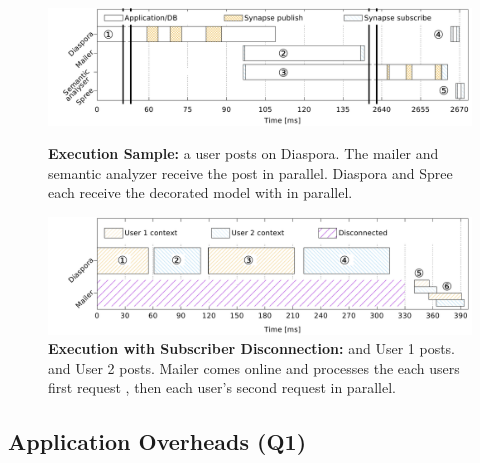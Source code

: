 \begin{figure}
  \centering
  \includegraphics[width=\linewidth]{figures/synapse/diaspora1.pdf}
  \caption{{\bf Execution Sample:}
      a user posts on Diaspora. The mailer  and semantic
     analyzer  receive the post in parallel. Diaspora  and Spree
      each receive the decorated model with in parallel.}
  \label{fig:diaspora1}


  \includegraphics[width=\linewidth]{figures/synapse/diaspora2.pdf}
  \caption{{\bf Execution with Subscriber Disconnection:}
     and  User 1 posts.  and  User 2 posts.
    Mailer comes online and processes the each users first request , then
  each user's second request  in parallel.}
  \label{fig:diaspora2}
\end{figure}

\subsection{Application Overheads (Q1)}
\label{sec:evaluation:overhead}


